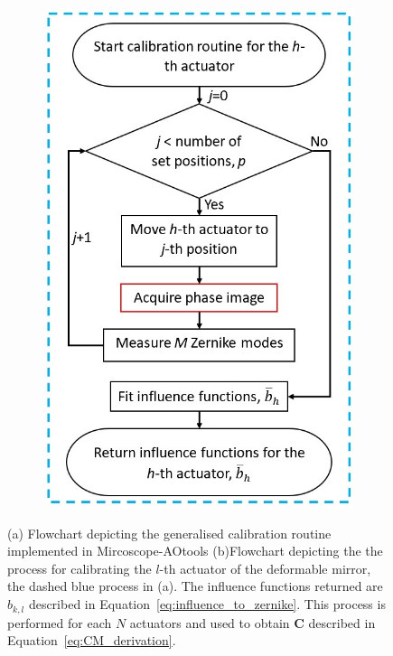 \begin{figure}[h]
\begin{subfigure}{0.45\textwidth}
		\includegraphics[width=1\linewidth, scale=0.5]{images/Ith_actuator_calibration_workflow_blue_border.jpg}
		\caption{}
		\label{fig:Ith_actuator_calibration_workflow_blue_border}
	\end{subfigure}
	\caption{(a) Flowchart depicting the generalised calibration routine implemented in Mircoscope-AOtools (b)Flowchart depicting the the process for calibrating the $l$-th actuator of the deformable mirror, the dashed blue process in (a). The influence functions returned are $b_{k,l}$ described in Equation~\ref{eq:influence_to_zernike}. This process is performed for each $N$ actuators and used to obtain $\boldsymbol{C}$ described in Equation~\ref{eq:CM_derivation}.}
	\label{fig:calibration_workflow}
\end{figure}

